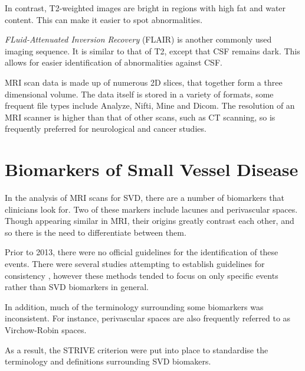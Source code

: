 In contrast, T2-weighted images are bright in regions with high fat and water content. This can make it easier to spot abnormalities.

\textit{FLuid-Attenuated Inversion Recovery} (FLAIR) is another commonly used imaging sequence. It is similar to that of T2, except that CSF remains dark. This allows for easier identification of abnormalities against CSF.


MRI scan data is made up of numerous 2D slices, that together form a three dimensional volume. The data itself is stored in a variety of formats, some frequent file types include Analyze, Nifti, Mine and Dicom. The resolution of an MRI scanner is higher than that of other scans, such as CT scanning, so is frequently preferred for neurological and cancer studies.

\section{Biomarkers of Small Vessel Disease}\label{svd-markers}

In the analysis of MRI scans for SVD, there are a number of biomarkers that clinicians look for. Two of these markers include lacunes and perivascular spaces. Though appearing similar in MRI, their origins greatly contrast each other, and so there is the need to differentiate between them.

Prior to 2013, there were no official guidelines for the identification of these events. There were several studies attempting to establish guidelines for consistency \cite{PotterGillian2015CPSV, AdamsH.H.Hieab2013RMfD}, however these methods tended to focus on only specific events rather than SVD biomarkers in general.

In addition, much of the terminology surrounding some biomarkers was inconsistent. For instance, perivascular spaces are also frequently referred to as Virchow-Robin spaces\cite{WardlawJ.M.2013Nsfr, AdamsH.H.Hieab2013RMfD}.

As a result, the STRIVE criterion \cite{WardlawJ.M.2013Nsfr} were put into place to standardise the terminology and definitions surrounding SVD biomakers.

